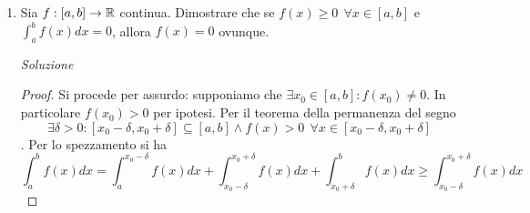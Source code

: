 \documentclass{article}
\newcommand{\se}{\text{ se }}
\renewcommand{\phi}{\varphi}
\begin{document}
\begin{enumerate}[label=\textbf{Esercizio 10.\arabic*.},itemindent=*]
    \paragraph*{Ricorda}(linearità dell'integrale) $\phi, \psi\in \mathcal{R}([a,b])$ e $\alpha, \beta\in \R$
    \[\int_a^b(\alpha \phi+\beta\psi)dx=\alpha\int_a^b\phi dx+\beta \int_a^b\psi dx\]
\begin{proof}
    Non è restrittivo supporre $f(x_0)>g(x_0)$. Definiamo
    \[h(x):=f(x)-g(x)=\begin{cases}
        0&\se x\neq x_0\\
        f(x_0)-g(x_0)&\se x=x_0
    \end{cases}\]
    e dimostriamo che $h$ è Riemann integrabile. Equivalentemente dimostriamo che 
    \[\forall \varepsilon>0~~\exists \mathcal{D}:S(\mathcal{D},h)-s(\mathcal{D},h)<\varepsilon\]
    Fissiamo $\varepsilon$ e definiamo
    \[\mathcal{D}_\varepsilon=\left\{a,x_0-\frac{\epsilon}{4h(x_0)},x_0+\frac{\epsilon}{4h(x_0)}, b\right\}\]
    Si ottiene che 
    \[s(\mathcal{D}_\varepsilon, h)=0\]
    infatti l'$\inf$ di $h$ su qualsiasi intervallo è 0. Si ha inoltre che
    \[\begin{aligned}S(\mathcal{D}_\epsilon, h)&=\cancel{(x_1-a)\sup_{[a,x_1]}f}+(x_2-x_1)h(x_0)+\cancel{(b-x_2)\sup_{[x_2,b]}f}=(x_1-x_2)(h(x_0))=\\&=\left[\cancel{x_0}+\frac{\varepsilon}{4h(x_0)}-x_0+\frac{\varepsilon}{4h(x_0)}\right]h(x_0)=h(x_0)\frac{\varepsilon}{2h(x_0)}=\frac{\varepsilon}{2}<\varepsilon\end{aligned}\]
$h$ è quindi Riemann integrabile, di conseguenza per linearità $g=f-h$ è Riemann integrabile. Rimane ora da dimostrare che $\int_a^bf(x)dx=\int_a^bg(x)dx$. Dimostriamo equivalentemente che $\int_a^bh(x)dx=0$. Osserviamo che le somme inferiori sono sempre 0, mentre le somme superiori risultano limitate dall'alto da $\frac{\varepsilon}{2}$, quindi facendo tendere $\varepsilon$ a 0 si ottiene che 
\[0=s(\mathcal{D})\leq \int_a^bh(x)dx\leq \frac{\varepsilon}{2}\]
\[\implies \int_a^bh(x)dx=0\]
\end{proof}
\item Sia $f:[a,b]\to\mathbb{R}$ continua. Dimostrare che se $f(x)\geq 0 ~~\forall x  \in [a,b]$ e $\int_a^bf(x)dx=0$, allora $f(x)=0$ ovunque. 
\item[\textit{\large Soluzione~}]~
\begin{proof}
    Si procede per assurdo: supponiamo che $\exists x_0\in [a,b]:f(x_0)\neq 0$. In particolare $f(x_0)>0$ per ipotesi. Per il teorema della permanenza del segno \[\exists \delta >0:[x_0-\delta,x_0+\delta]\subseteq [a,b] \land f(x)>0~~\forall x\in [x_0-\delta,x_0+\delta]\]. Per lo spezzamento si ha\[\int_a^bf(x)dx=\int_a^{x_0-\delta}f(x)dx+\int_{x_0-\delta}^{x_0+\delta}f(x)dx+\int_{x_0+\delta}^bf(x)dx\geq \int_{x_0-\delta}^{x_0+\delta}f(x)dx\]

\end{proof}
\end{enumerate}
\end{document}
